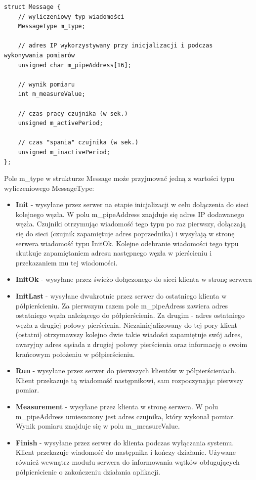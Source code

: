 \documentclass[a4paper,11pt]{article}
\begin{document}
\begin{verbatim}
struct Message {
    // wyliczeniowy typ wiadomości
    MessageType m_type;

    // adres IP wykorzystywany przy inicjalizacji i podczas wykonywania pomiarów
    unsigned char m_pipeAddress[16];

    // wynik pomiaru
    int m_measureValue;

    // czas pracy czujnika (w sek.)
    unsigned m_activePeriod;

    // czas "spania" czujnika (w sek.)
    unsigned m_inactivePeriod;
};
\end{verbatim}

Pole m\_type w strukturze Message może przyjmować jedną z wartości typu wyliczeniowego
MessageType:

\begin{itemize}
\item \textbf{Init} - wysyłane przez serwer na etapie inicjalizacji w celu dołączenia do sieci kolejnego węzła. W polu m\_pipeAddress znajduje się adres IP dodawanego węzła. Czujniki otrzymując wiadomość tego typu po raz pierwszy, dołączają się do sieci (czujnik zapamiętuje adres poprzednika) i wysyłają w stronę serwera wiadomość typu InitOk. Kolejne odebranie wiadomości tego typu skutkuje zapamiętaniem adresu następnego węzła w pierścieniu i przekazaniem mu tej wiadomości.
\item \textbf{InitOk} - wysyłane przez świeżo dołączonego do sieci klienta w stronę serwera
\item \textbf{InitLast} - wysyłane dwukrotnie przez serwer do ostatniego klienta w półpierścieniu. Za pierwszym razem pole m\_pipeAdress zawiera adres ostatniego węzła należącego do półpierścienia. Za drugim - adres ostatniego węzła z drugiej połowy pierścienia. Niezainicjalizowany do tej pory klient (ostatni) otrzymawszy kolejno dwie takie wiadości zapamiętuje swój adres, awaryjny adres sąsiada z drugiej połowy pierścienia oraz informację o swoim krańcowym położeniu w półpierścieniu.
\item \textbf{Run} - wysyłane przez serwer do pierwszych klientów w półpierścieniach. Klient przekazuje tą wiadomość następnikowi, sam rozpoczynając pierwszy pomiar.
\item \textbf{Measurement} - wysyłane przez klienta w stronę serwera. W polu m\_pipeAddress umieszczony jest adres czujnika, który wykonał pomiar. Wynik pomiaru znajduje się w  polu m\_measureValue.
\item \textbf{Finish} - wysyłane przez serwer do klienta podczas wyłączania systemu. Klient przekazuje wiadomość do następnika i kończy działanie. Używane również wewnątrz modułu serwera do informowania wątków obługujących półpierścienie o zakończeniu działania aplikacji.

\end{itemize}
\end{document}
